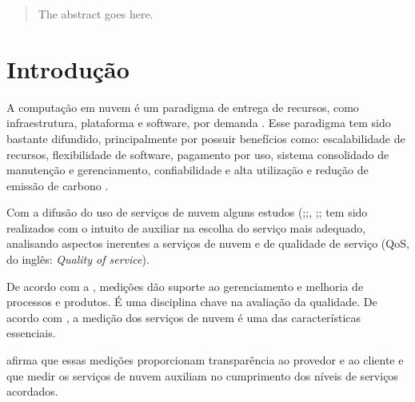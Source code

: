 \documentclass[conference]{IEEEtran}
\begin{document}
\maketitle

\begin{abstract}
The abstract goes here.
\end{abstract}





%
\IEEEpeerreviewmaketitle



\section{Introdução}
A computação em nuvem é um paradigma de entrega de recursos, como infraestrutura, plataforma e software,
por demanda \cite{garg2011}. Esse paradigma tem sido bastante difundido, principalmente por possuir benefícios como: escalabilidade de recursos, flexibilidade de software, pagamento por uso, sistema consolidado de manutenção e gerenciamento, confiabilidade e alta utilização e redução de 
emissão de carbono \cite{rehman2011teaching}.

Com a difusão do uso de serviços de nuvem alguns estudos (;;, 
;; tem sido realizados com o intuito de auxiliar na 
escolha do serviço mais adequado, analisando aspectos inerentes a serviços de nuvem e de qualidade de serviço 
(QoS, do inglês: \textit{Quality of service}).

De acordo com a , medições dão suporte ao gerenciamento e melhoria de processos e produtos. É uma disciplina
chave na avaliação da qualidade. De acordo com , a medição dos serviços de nuvem é uma das características essenciais. 

 afirma que essas medições proporcionam
transparência ao provedor e ao cliente e que medir os serviços de nuvem auxiliam no 
cumprimento dos níveis de serviços acordados.
\end{document}
